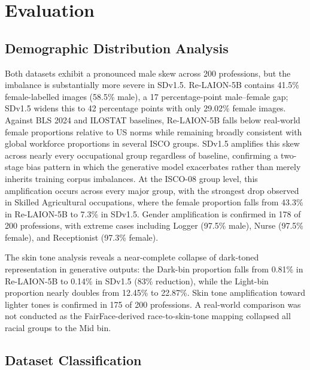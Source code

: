 \section{Evaluation}

\subsection{Demographic Distribution Analysis}

Both datasets exhibit a pronounced male skew across 200 professions, but the imbalance
is substantially more severe in SDv1.5. Re-LAION-5B contains 41.5\% female-labelled
images (58.5\% male), a 17 percentage-point male--female gap; SDv1.5 widens this
to 42 percentage points with only 29.02\% female images. Against BLS 2024 and ILOSTAT
baselines, Re-LAION-5B falls below real-world female proportions relative to US norms
while remaining broadly consistent with global workforce proportions in several ISCO
groups. SDv1.5 amplifies this skew across nearly every occupational group regardless of
baseline, confirming a two-stage bias pattern in which the generative model exacerbates
rather than merely inherits training corpus imbalances. At the ISCO-08 group level, this
amplification occurs across every major group, with the strongest drop observed in Skilled
Agricultural occupations, where the female proportion falls from 43.3\% in Re-LAION-5B to
7.3\% in SDv1.5. Gender amplification is confirmed in 178 of 200 professions, with extreme cases including Logger (97.5\% male), Nurse (97.5\% female), and Receptionist (97.3\% female).

The skin tone analysis reveals a near-complete collapse of dark-toned representation in
generative outputs: the Dark-bin proportion falls from 0.81\% in Re-LAION-5B to 0.14\%
in SDv1.5 (83\% reduction), while the Light-bin proportion nearly doubles from 12.45\%
to 22.87\%. Skin tone amplification toward lighter tones is confirmed in 175 of 200
professions. A real-world comparison was not conducted as the FairFace-derived
race-to-skin-tone mapping collapsed all racial groups to the Mid bin.

\subsection{Dataset Classification}

